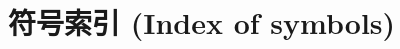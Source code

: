 \chapter*{符号索引 (Index of symbols)}

\newcommand{\pg}[1]{第~\pageref{#1} 页}
\newcommand{\symbolindex}[2]{\hbox{\makebox[0.2\textwidth][s]{#1\hfill}\hspace*{2.5em}\parbox[t]{0.65\textwidth}{#2\hfill}}\\[1.5pt]}


